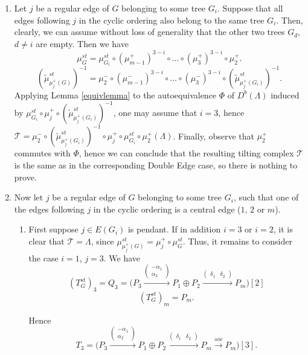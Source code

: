 \documentclass[12pt]{amsart}
\theoremstyle{plain}
\theoremstyle{remark}
\theoremstyle{definition}
\begin{document}
\begin{enumerate}
    \item Let $j$ be a regular edge of $G$ belonging to some tree $G_i$. Suppose that all edges following $j$ in the cyclic ordering also belong to the same tree $G_i$. Then, clearly, we can assume without loss of generality that the other two trees $G_d$, $d \neq i$ are empty. Then we have 
    $$\mu^{st}_G =  \mu^{st}_{G_i} \circ (\mu_{m-1}^+)^{3-i} \circ \dots \circ (\mu_3^+)^{3-i} \circ \mu_2^+. $$ 
    $$ (\widetilde{\mu}^{st}_{\mu^+_j(G)})^{-1} =    \mu_2^- \circ (\mu_{m-1}^-)^{3-i} \circ \dots \circ (\mu_3^-)^{3-i} \circ (\widetilde{\mu}^{st}_{\mu^+_j(G_i)})^{-1}.$$ 
    \noindent Applying Lemma \ref{equivlemma} to the  autoequivalence $\Phi$ of $D^b(\Lambda)$ induced by $\mu^{st}_{G_i} \circ \mu_j^+ \circ (\widetilde{\mu}^{st}_{\mu^+_j(G_i)})^{-1}$, one may assume that $i = 3$, hence $\mathcal{T} =    \mu_2^- \circ (\widetilde{\mu}^{st}_{\mu^+_j(G_i)})^{-1} \circ  \mu_j^+ \circ \mu^{st}_{G_i} \circ \mu_2^+(\Lambda)$. Finally, observe that $\mu_2^+$ commutes with $\Phi$, hence we can conclude that the resulting tilting complex $\mathcal{T}$ is the same as in the corresponding Double Edge case, so there is nothing to prove. 
    
    \item Now let $j$ be a regular edge of $G$ belonging to some tree $G_i$, such that one of the edges following $j$ in the cyclic ordering is a central edge ($1$, $2$ or $m$). 
    
    \begin{enumerate}
        \item First suppose $j \in E(G_i)$ is pendant. If in addition $i = 3$ or $i=2$, it is clear that $\mathcal{T} = \Lambda$, since $\mu_{\mu_j^+(G)}^{st} = \mu_j^+ \circ \mu_{G}^{st}$. Thus, it remains to consider the case $i=1$, $j=3$. We have 
         $$(T^{st}_G)_{3} = Q_3 = \bigg(P_3 \xrightarrow{\begin{pmatrix} -\alpha_1 \\ 
 \alpha_2 \end{pmatrix}} P_1\oplus P_{2} \xrightarrow{\begin{pmatrix} \delta_1 & \delta_2 \end{pmatrix}} P_{m}\bigg) [2]$$ $$(T^{st}_G)_{m} =P_{m}.$$
      
     Hence $$T_3 = \bigg(P_3 \xrightarrow{\begin{pmatrix} -\alpha_1 \\ 
 \alpha_2 \end{pmatrix}} P_1\oplus P_{2} \xrightarrow{\begin{pmatrix} \delta_1 & \delta_2 \end{pmatrix}} P_{m}  \xrightarrow{soc} P_{m}\bigg) [3] .$$
 

\end{enumerate}
\end{enumerate}
\end{document}
